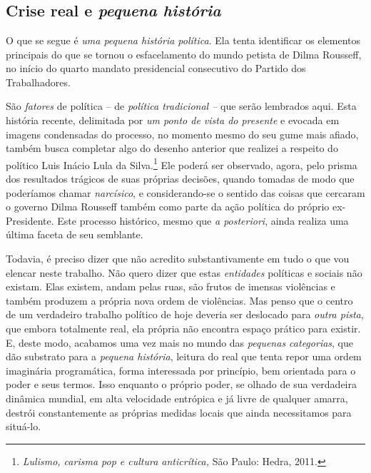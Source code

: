 

\chapter*{}


\section{Crise real e \emph{pequena
  história}}\label{crise-real-e-pequena-histuxf3ria}


O que se segue é \emph{uma pequena história política}. Ela tenta
identificar os elementos principais do que se tornou o esfacelamento do
mundo petista de Dilma Rousseff, no início do quarto mandato
presidencial consecutivo do Partido dos Trabalhadores.

São \emph{fatores} de política -- de \emph{política tradicional --} que
serão lembrados aqui. Esta história recente, delimitada por \emph{um
ponto de vista do presente} e evocada em imagens condensadas do
processo, no momento mesmo do seu gume mais afiado, também busca
completar algo do desenho anterior que realizei a respeito do político
Luis Inácio Lula da Silva.\footnote{\emph{Lulismo, carisma pop e cultura
anticrítica,} São Paulo: Hedra, 2011.} Ele
poderá ser observado, agora, pelo prisma dos resultados trágicos de suas
próprias decisões, quando tomadas de modo que poderíamos chamar
\emph{narcísico}, e considerando-se o sentido das coisas que cercaram o
governo Dilma Rousseff também como parte da ação política do próprio
ex-Presidente. Este processo histórico, mesmo que \textit{a posteriori}, ainda
realiza uma última faceta de seu semblante.

Todavia, é preciso dizer que não acredito substantivamente em tudo o que
vou elencar neste trabalho. Não quero dizer que estas \emph{entidades}
políticas e sociais não existam. Elas existem, andam pelas ruas, são
frutos de imensas violências e também produzem a própria nova ordem de
violências. Mas penso que o centro de um verdadeiro trabalho político
de hoje deveria ser deslocado para \emph{outra pista}, que embora
totalmente real, ela própria não encontra espaço prático para existir.
E, deste modo, acabamos uma vez mais no mundo das \emph{pequenas
categorias}, que dão substrato para a \emph{pequena história}, leitura
do real que tenta repor uma ordem imaginária programática, forma
interessada por princípio, bem orientada para o poder e seus termos.
Isso enquanto o próprio poder, se olhado de sua verdadeira dinâmica
mundial, em alta velocidade entrópica e já livre de qualquer amarra,
destrói constantemente as próprias medidas locais que ainda necessitamos
para situá-lo.

